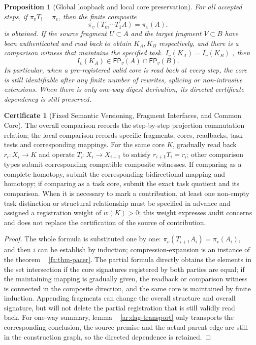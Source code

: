 \documentclass[11pt,a4paper]{article}
\theoremstyle{plain}
\newtheorem{proposition}[theorem]{Proposition}
\theoremstyle{definition}
\newtheorem*{certificate}{Certificate}
\theoremstyle{remark}
\begin{document}
\begin{CJK*}
\begin{proposition}
[Global loopback and local core preservation]\label{ar:invariants}
For all accepted steps, if $\pi_v T_i=\pi_v$, then the finite composite \[
 \pi_v(T_m\cdots T_1 A)=\pi_v(A).
\] is obtained. If the source fragment $U\subset A$ and the target fragment $V\subset B$ have been authenticated and read back to obtain $K_A,K_B$ respectively, and there is a comparison witness that maintains the specified task. $I_v(K_A)=I_v(K_B)$ , then \[
 I_v(K_A)\in\mathsf{FP}_v(A)\cap\mathsf{FP}_v(B).
\] In particular, when a pre-registered valid core is read back at every step, the core is still identifiable after any finite number of rewrites, splicing or non-intrusive extensions. When there is only one-way digest derivation, its directed certificate dependency is still preserved.\end{proposition}
\begin{certificate}
[Fixed Semantic Versioning, Fragment Interfaces, and Common Core]The overall comparison records the step-by-step projection commutation relation; the local comparison records specific fragments, cores, readbacks, task tests and corresponding mappings. For the same core $K$, gradually read back $r_i:X_i\to K$ and operate $T_i:X_i\to X_{i+1}$ to satisfy $r_{i+1}T_i=r_i$; other comparison types submit corresponding compatible composite witnesses. If comparing as a complete homotopy, submit the corresponding bidirectional mapping and homotopy; if comparing as a task core, submit the exact task quotient and its comparison. When it is necessary to mark a contribution, at least one non-empty task distinction or structural relationship must be specified in advance and assigned a registration weight of $w(K)>0$; this weight expresses audit concerns and does not replace the certification of the source of contribution.\end{certificate}
\begin{proof}
The whole formula is substituted one by one: $\pi_v(T_{i+1}A_i)=\pi_v(A_i)$, and then $i$ can be establish by induction; compression-expansion is an instance of the theorem ~ \ref{fa:thm-pacer}. The partial formula directly obtains the elements in the set intersection if the core signatures registered by both parties are equal; if the maintaining mapping is gradually given, the readback or comparison witness is connected in the composite direction, and the same core is maintained by finite induction. Appending fragments can change the overall structure and overall signature, but will not delete the partial registration that is still validly read back. For one-way summary, lemma ~ \ref{ar:dag-transport} only transports the corresponding conclusion, the source premise and the actual parent edge are still in the construction graph, so the directed dependence is retained.\end{proof}



\end{CJK*}
\end{document}
